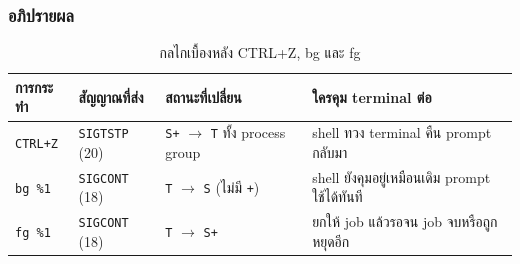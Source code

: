 \documentclass[a4paper,11pt]{article}
\newcommand{\code}[1]{\texttt{#1}}
\begin{document}
\subsubsection{อภิปรายผล}

\begin{table}[H]
\centering\small
\caption{กลไกเบื้องหลัง CTRL+Z, bg และ fg}
\begin{tabular}{p{2.0cm}p{2.6cm}p{3.6cm}p{5.4cm}}
\toprule
\textbf{การกระทำ} & \textbf{สัญญาณที่ส่ง} & \textbf{สถานะที่เปลี่ยน} & \textbf{ใครคุม terminal ต่อ} \\
\midrule
\code{CTRL+Z} & \code{SIGTSTP} (20) & \code{S+} $\rightarrow$ \code{T} ทั้ง process group & shell ทวง terminal คืน prompt กลับมา \\
\code{bg \%1} & \code{SIGCONT} (18) & \code{T} $\rightarrow$ \code{S} (ไม่มี \code{+}) & shell ยังคุมอยู่เหมือนเดิม prompt ใช้ได้ทันที \\
\code{fg \%1} & \code{SIGCONT} (18) & \code{T} $\rightarrow$ \code{S+} & ยกให้ job แล้วรอจน job จบหรือถูกหยุดอีก \\
\bottomrule
\end{tabular}
\end{table}
\end{document}
